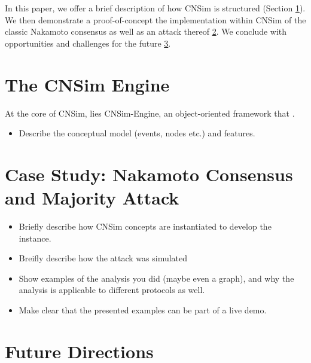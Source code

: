 \documentclass[conference]{IEEEtran}
\begin{document}
In this paper, we offer a brief description of how CNSim is structured (Section \ref{sec:cnsim}). We then demonstrate a proof-of-concept the implementation within CNSim of the classic Nakamoto consensus as well as an attack thereof \ref{sec:nakamoto}. We conclude with opportunities and challenges for the future \ref{sec:future}.


\section{The CNSim Engine}\label{sec:cnsim}

At the core of CNSim, lies CNSim-Engine, an object-oriented framework that .

\begin{itemize}
\item Describe the conceptual model (events, nodes etc.) and features.
\end{itemize}

\section{Case Study: Nakamoto Consensus and Majority Attack}\label{sec:nakamoto}
\begin{itemize}
\item Briefly describe how CNSim concepts are instantiated to develop the instance.
\item Breifly describe how the attack was simulated
\item Show examples of the analysis you did (maybe even a graph), and why the analysis is applicable to different protocols as well.
\item Make clear that the presented examples can be part of a live demo.
\end{itemize}



\section{Future Directions}\label{sec:future}


%
\end{document}
